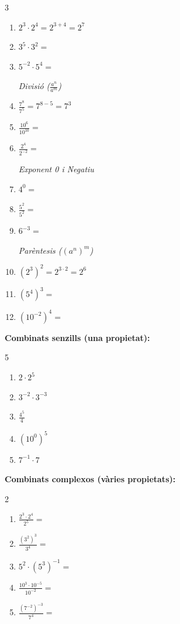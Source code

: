 \documentclass[12pt,a4paper]{article}
\begin{document}
\begin{multicols}{3}
\begin{enumerate}[label=\alph*)]
    \textit{\small Producte ($a^n \cdot a^m$)}
    \item $2^3 \cdot 2^4 = 2^{3+4} = 2^7$
    \item $3^5 \cdot 3^2 =$
    \item $5^{-2} \cdot 5^4 =$
    
    \textit{\small Divisió ($\frac{a^n}{a^m}$)}
    \item $\frac{7^8}{7^5} = 7^{8-5} = 7^3$
    \item $\frac{10^6}{10^{10}} =$
    \item $\frac{2^4}{2^{-2}} =$

    \textit{\small Exponent 0 i Negatiu}
    \item $4^0 =$
    \item $\frac{5^2}{5^2} =$
    \item $6^{-3} =$

    \textit{\small Parèntesis ($(a^n)^m$)}
    \item $(2^3)^2 = 2^{3 \cdot 2} = 2^6$
    \item $(5^4)^3 =$
    \item $(10^{-2})^4 =$
\end{enumerate}
\end{multicols}

\textbf{Combinats senzills (una propietat):}
\begin{multicols}{5}
\begin{enumerate}[label=\alph*), resume]
    \item $2 \cdot 2^5$
    \item $3^{-2} \cdot 3^{-3}$
    \item $\frac{4^5}{4}$
    \item $(10^0)^5$
    \item $7^{-1} \cdot 7$
\end{enumerate}
\end{multicols}

\textbf{Combinats complexos (vàries propietats):}
\begin{multicols}{2}
\begin{enumerate}[label=\alph*), resume]
    \item $\frac{2^3 \cdot 2^4}{2^5} =$
    \item $\frac{(3^2)^3}{3^4} =$
    \item $5^2 \cdot (5^3)^{-1} =$
    \item $\frac{10^3 \cdot 10^{-5}}{10^{-2}} =$
    \item $\frac{(7^{-2})^{-3}}{7^4} =$
\end{enumerate}
\end{multicols}
\end{document}
